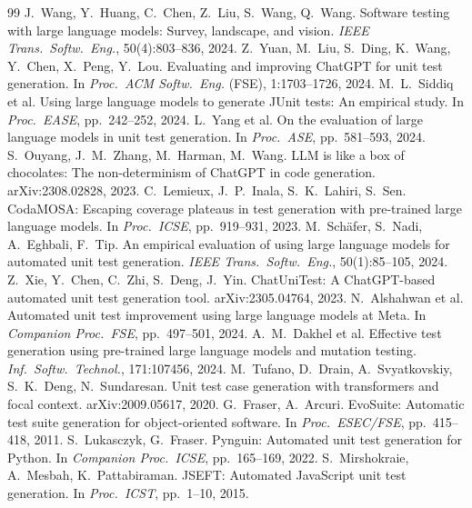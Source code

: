 \documentclass[11pt]{article}
\begin{document}
\begin{thebibliography}{99}
\small
{} J.~Wang, Y.~Huang, C.~Chen, Z.~Liu, S.~Wang, Q.~Wang. Software testing with large language models: Survey, landscape, and vision. \textit{IEEE Trans.\ Softw.\ Eng.}, 50(4):803--836, 2024.
 Z.~Yuan, M.~Liu, S.~Ding, K.~Wang, Y.~Chen, X.~Peng, Y.~Lou. Evaluating and improving ChatGPT for unit test generation. In \textit{Proc.\ ACM Softw.\ Eng.} (FSE), 1:1703--1726, 2024.
 M.~L.~Siddiq et al. Using large language models to generate JUnit tests: An empirical study. In \textit{Proc.\ EASE}, pp.\ 242--252, 2024.
 L.~Yang et al. On the evaluation of large language models in unit test generation. In \textit{Proc.\ ASE}, pp.\ 581--593, 2024.
 S.~Ouyang, J.~M.~Zhang, M.~Harman, M.~Wang. LLM is like a box of chocolates: The non-determinism of ChatGPT in code generation. arXiv:2308.02828, 2023.
 C.~Lemieux, J.~P.~Inala, S.~K.~Lahiri, S.~Sen. CodaMOSA: Escaping coverage plateaus in test generation with pre-trained large language models. In \textit{Proc.\ ICSE}, pp.\ 919--931, 2023.
 M.~Sch\"afer, S.~Nadi, A.~Eghbali, F.~Tip. An empirical evaluation of using large language models for automated unit test generation. \textit{IEEE Trans.\ Softw.\ Eng.}, 50(1):85--105, 2024.
 Z.~Xie, Y.~Chen, C.~Zhi, S.~Deng, J.~Yin. ChatUniTest: A ChatGPT-based automated unit test generation tool. arXiv:2305.04764, 2023.
 N.~Alshahwan et al. Automated unit test improvement using large language models at Meta. In \textit{Companion Proc.\ FSE}, pp.\ 497--501, 2024.
 A.~M.~Dakhel et al. Effective test generation using pre-trained large language models and mutation testing. \textit{Inf.\ Softw.\ Technol.}, 171:107456, 2024.
 M.~Tufano, D.~Drain, A.~Svyatkovskiy, S.~K.~Deng, N.~Sundaresan. Unit test case generation with transformers and focal context. arXiv:2009.05617, 2020.
 G.~Fraser, A.~Arcuri. EvoSuite: Automatic test suite generation for object-oriented software. In \textit{Proc.\ ESEC/FSE}, pp.\ 415--418, 2011.
 S.~Lukasczyk, G.~Fraser. Pynguin: Automated unit test generation for Python. In \textit{Companion Proc.\ ICSE}, pp.\ 165--169, 2022.
 S.~Mirshokraie, A.~Mesbah, K.~Pattabiraman. JSEFT: Automated JavaScript unit test generation. In \textit{Proc.\ ICST}, pp.\ 1--10, 2015.

\end{thebibliography}
\end{document}

